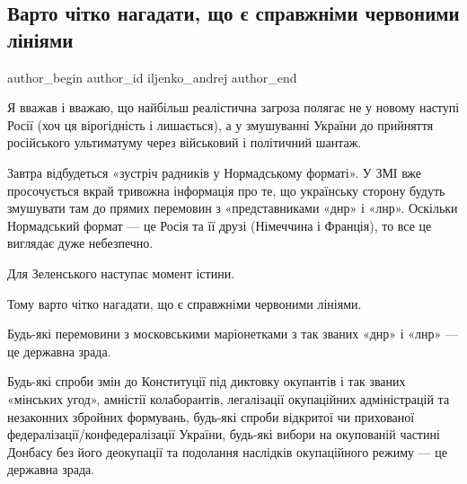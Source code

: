  
 
 
 
 
 
\subsection{Варто чітко нагадати, що є справжніми червоними лініями}
\label{sec:25_01_2022.fb.iljenko_andrej.1.chervoni_linii}
 
\ifcmt
 author_begin
   author_id iljenko_andrej
 author_end
\fi

Я вважав і вважаю, що найбільш реалістична загроза полягає не у новому наступі
Росії (хоч ця вірогідність і лишається), а у змушуванні України до прийняття
російського ультиматуму через військовий і політичний шантаж. 

Завтра відбудеться «зустріч радників у Нормадському форматі». У ЗМІ вже
просочується вкрай тривожна інформація про те, що українську сторону будуть
змушувати там до прямих перемовин з «представниками «днр» і «лнр». Оскільки
Нормадський формат — це Росія та її друзі (Німеччина і Франція), то все це
виглядає дуже небезпечно.

Для Зеленського наступає момент істини. 

Тому варто чітко нагадати, що є справжніми червоними лініями.

Будь-які перемовини з московськими маріонетками з так званих «днр» і «лнр» — це
державна зрада.

Будь-які спроби змін до Конституції під диктовку окупантів і так званих
«мінських угод», амністії колаборантів, легалізації окупаційних адміністрацій
та незаконних збройних формувань, будь-які спроби відкритої чи прихованої
федералізації/конфедералізації України, будь-які вибори на окупованій частині
Донбасу без його деокупації та подолання наслідків окупаційного режиму — це
державна зрада.
